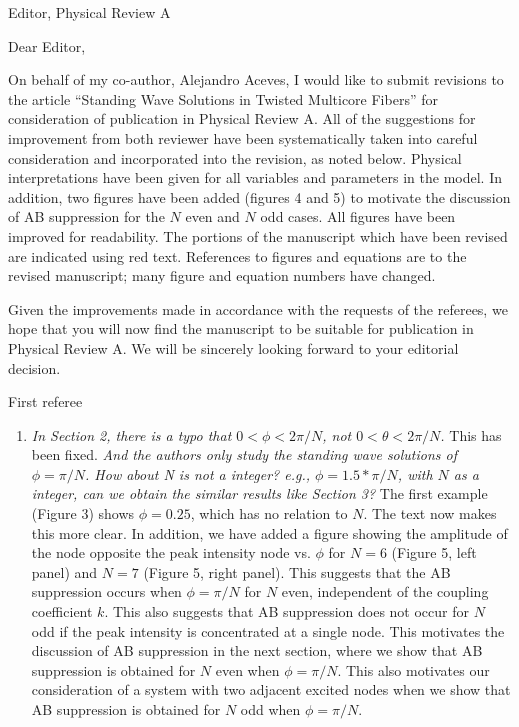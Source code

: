 \documentclass[11pt]{letter}
\begin{document}
\address{Ross Parker \\
Department of Mathematics \\
Southern Methodist University \\
Dallas, TX 75275 \\
\texttt{rhparker@smu.edu}}%
\signature{Ross Parker}
\begin{letter}{Editor, Physical Review A}

\opening{Dear Editor,}

On behalf of my co-author, Alejandro Aceves, I would like to submit revisions to the article ``Standing Wave Solutions in Twisted Multicore Fibers'' for consideration of publication in Physical Review A. All of the suggestions for improvement from both reviewer have been systematically taken into careful consideration and incorporated into the revision, as noted below. Physical interpretations have been given for all variables and parameters in the model. In addition, two figures have been added (figures 4 and 5) to motivate the discussion of AB suppression for the $N$ even and $N$ odd cases. All figures have been improved for readability. The portions of the manuscript which have been revised are indicated using red text. References to figures and equations are to the revised manuscript; many figure and equation numbers have changed.

Given the improvements made in accordance with the requests of the referees, we hope that you will now find the manuscript to be suitable for publication in Physical Review A. We will be sincerely looking forward to your editorial decision.

First referee
\begin{enumerate}
\item \emph{In Section 2, there is a typo that $0<\phi<2\pi/N$, not $0<\theta<2\pi/N$.} This has been fixed. \emph{And the authors only study the standing wave solutions of $\phi=\pi/N$. How about N is not a integer? e.g., $\phi=1.5*\pi/N$, with $N$ as a integer, can we obtain the similar results like Section 3?} The first example (Figure 3) shows $\phi = 0.25$, which has no relation to $N$. The text now makes this more clear. In addition, we have added a figure showing the amplitude of the node opposite the peak intensity node vs. $\phi$ for $N=6$ (Figure 5, left panel) and $N=7$ (Figure 5, right panel). This suggests that the AB suppression occurs when $\phi = \pi/N$ for $N$ even, independent of the coupling coefficient $k$. This also suggests that AB suppression does not occur for $N$ odd if the peak intensity is concentrated at a single node. This motivates the discussion of AB suppression in the next section, where we show that AB suppression is obtained for $N$ even when $\phi = \pi/N$. This also motivates our consideration of a system with two adjacent excited nodes when we show that AB suppression is obtained for $N$ odd when $\phi = \pi/N$.


\end{enumerate}
\end{letter}
\end{document}

